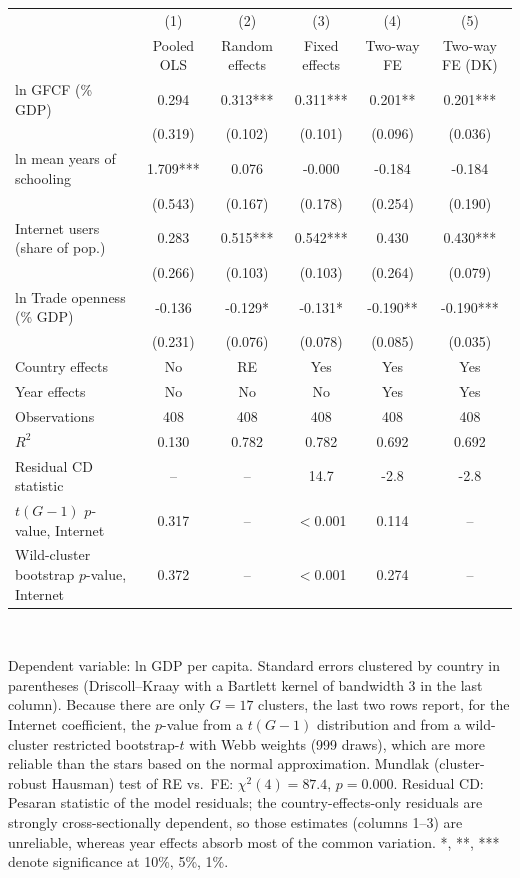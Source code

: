 \begin{tabular}{lccccc}\toprule
 & (1) & (2) & (3) & (4) & (5) \\
 & Pooled OLS & Random effects & Fixed effects & Two-way FE & Two-way FE (DK) \\
\midrule
ln GFCF (\% GDP) & 0.294 & 0.313*** & 0.311*** & 0.201** & 0.201*** \\
 & (0.319) & (0.102) & (0.101) & (0.096) & (0.036) \\
ln mean years of schooling & 1.709*** & 0.076 & -0.000 & -0.184 & -0.184 \\
 & (0.543) & (0.167) & (0.178) & (0.254) & (0.190) \\
Internet users (share of pop.) & 0.283 & 0.515*** & 0.542*** & 0.430 & 0.430*** \\
 & (0.266) & (0.103) & (0.103) & (0.264) & (0.079) \\
ln Trade openness (\% GDP) & -0.136 & -0.129* & -0.131* & -0.190** & -0.190*** \\
 & (0.231) & (0.076) & (0.078) & (0.085) & (0.035) \\
\midrule
Country effects & No & RE & Yes & Yes & Yes \\
Year effects & No & No & No & Yes & Yes \\
Observations & 408 & 408 & 408 & 408 & 408 \\
$R^2$ & 0.130 & 0.782 & 0.782 & 0.692 & 0.692 \\
Residual CD statistic & -- & -- & 14.7 & -2.8 & -2.8 \\
$t(G-1)$ $p$-value, Internet & 0.317 & -- & $<$0.001 & 0.114 & -- \\
Wild-cluster bootstrap $p$-value, Internet & 0.372 & -- & $<$0.001 & 0.274 & -- \\
\bottomrule\end{tabular}
\\[3pt]\begin{minipage}{\tablewidth}\footnotesize Dependent variable: ln GDP per capita. Standard errors clustered by country in parentheses (Driscoll--Kraay with a Bartlett kernel of bandwidth 3 in the last column). Because there are only $G=17$ clusters, the last two rows report, for the Internet coefficient, the $p$-value from a $t(G-1)$ distribution and from a wild-cluster restricted bootstrap-$t$ with Webb weights (999 draws), which are more reliable than the stars based on the normal approximation. Mundlak (cluster-robust Hausman) test of RE vs.\ FE: $\chi^2(4)=87.4$, $p=0.000$. Residual CD: Pesaran statistic of the model residuals; the country-effects-only residuals are strongly cross-sectionally dependent, so those estimates (columns 1--3) are unreliable, whereas year effects absorb most of the common variation. *, **, *** denote significance at 10\%, 5\%, 1\%.\end{minipage}
